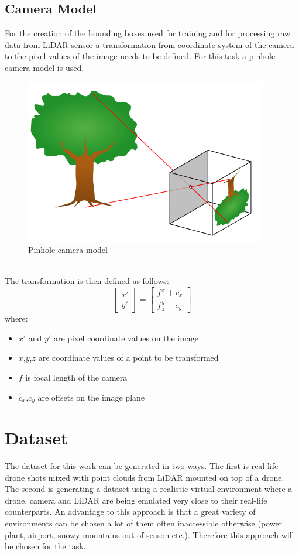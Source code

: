 \documentclass[twoside]{ctuthesis}
\theoremstyle{plain}
\theoremstyle{definition}
\theoremstyle{note}
\begin{document}
\section{Camera Model}
For the creation of the bounding boxes used for training and for processing raw data from LiDAR sensor a transformation from coordinate system of the camera to the pixel values of the image needs to be defined. For this task a pinhole camera model is used.
\begin{figure}[h]
	\centering
	\includegraphics[width=\textwidth]{pinhole.png}
	\caption{Pinhole camera model}
\end{figure}\\
The transformation is then defined as follows:
\begin{equation}
	\begin{bmatrix}
		x'\\
		y'
	\end{bmatrix}=
	\begin{bmatrix}
		f\frac{x}{z}+c_x\\
		f\frac{y}{z}+c_y
	\end{bmatrix}
\end{equation}
where:
\begin{itemize}
	\item $x'$ and $y'$ are pixel coordinate values on the image
	\item $x$,$y$,$z$ are coordinate values of a point to be transformed
	\item $f$ is focal length of the camera
	\item $c_x$,$c_y$ are offsets on the image plane
\end{itemize}
\chapter{Dataset}
The dataset for this work can be generated in two ways. The first is real-life drone shots mixed with point clouds from LiDAR mounted on top of a drone. The second is generating a dataset using a realistic virtual environment where a drone, camera and LiDAR are being emulated very close to their real-life counterparts. An advantage to this approach is that a great variety of environments can be chosen a lot of them often inaccessible otherwise (power plant, airport, snowy mountains out of season etc.). Therefore this approach will be chosen for the task.
\end{document}
